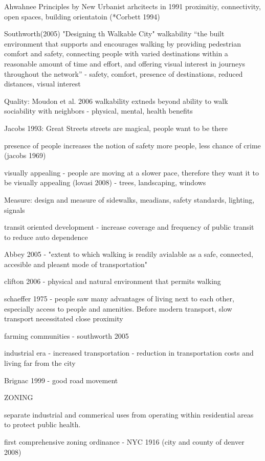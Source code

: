 Ahwahnee Principles by New Urbanist arhcitects in 1991
proximitiy, connectivity, open spaces, building orientatoin (*Corbett 1994)

Southworth(2005) "Designing th Walkable City"
walkability “the built environment that supports and encourages walking by providing pedestrian comfort and safety, connecting people with varied destinations within a reasonable amount of time and effort, and offering visual interest in journeys throughout the network” - safety, comfort, presence of destinations, reduced distances, visual interest

Quality: Moudon et al. 2006
walkability extneds beyond ability to walk
sociability with neighbors - physical, mental, health benefits

Jacobs 1993: Great Streets
streets are magical, people want to be there

presence of people increases the notion of safety
more people, less chance of crime (jacobs 1969)

visually appealing - people are moving at a slower pace, therefore they want it to be visually appealing (lovasi 2008) - trees, landscaping, windows


Measure:  design and measure of sidewalks, meadians, safety standards, lighting, signals

transit oriented development - increase coverage and frequency of public transit to reduce auto dependence

Abbey 2005 - "extent to which walking is readily avialable as a safe, connected, accesible and pleasnt mode of transportation"

clifton 2006 - physical and natural environment that permits walking

schaeffer 1975 - people saw many advantages of living next to each other, especially access to people and amenities.  Before modern transport, slow transport necessitated close proximity

farming communities - southworth 2005

industrial era - increased transportation - reduction in transportation costs and living far from the city

Brignac 1999 - good road movement



ZONING

separate industrial and commerical uses from operating within residential areas to protect public health.

first comprehensive zoning ordinance - NYC 1916 (city and county of denver 2008)

